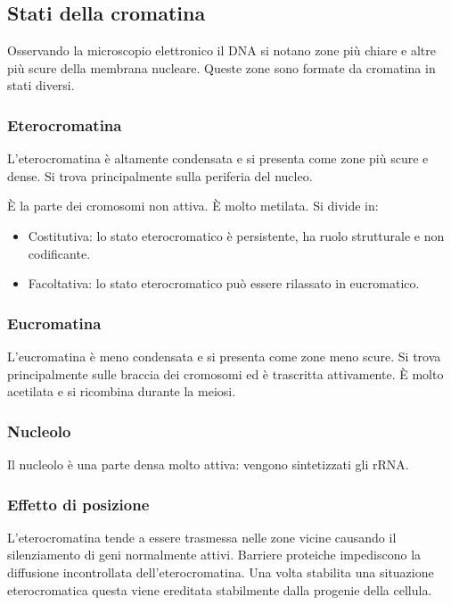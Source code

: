 	\subsection{Stati della cromatina}
	Osservando la microscopio elettronico il DNA si notano zone pi\`u chiare e altre pi\`u scure della membrana nucleare.
	Queste zone sono formate da cromatina in stati diversi.

		\subsubsection{Eterocromatina}
		L'eterocromatina \`e altamente condensata e si presenta come zone pi\`u scure e dense.
		Si trova principalmente sulla periferia del nucleo. 

		\`E la parte dei cromosomi non attiva.
		\`E molto metilata.
		Si divide in:
		\begin{multicols}{2}
			\begin{itemize}
				\item Costitutiva: lo stato eterocromatico \`e persistente, ha ruolo strutturale e non codificante.
				\item Facoltativa: lo stato eterocromatico pu\`o essere rilassato in eucromatico.
			\end{itemize}
		\end{multicols}

		\subsubsection{Eucromatina}
		L'eucromatina \`e meno condensata e si presenta come zone meno scure.
		Si trova principalmente sulle braccia dei cromosomi ed \`e trascritta attivamente.
		\`E molto acetilata e si ricombina durante la meiosi.

		\subsubsection{Nucleolo}
		Il nucleolo \`e una parte densa molto attiva: vengono sintetizzati gli rRNA.

		\subsubsection{Effetto di posizione}
		L'eterocromatina tende a essere trasmessa nelle zone vicine causando il silenziamento di geni normalmente attivi.
		Barriere proteiche impediscono la diffusione incontrollata dell'eterocromatina.
		Una volta stabilita una situazione eterocromatica questa viene ereditata stabilmente dalla progenie della cellula.

